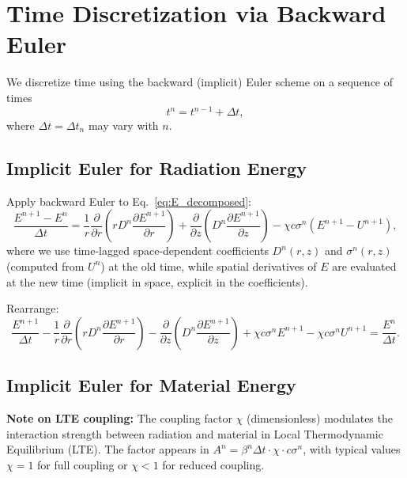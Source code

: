 \documentclass[12pt,oneside]{article}
\begin{document}
\section{Time Discretization via Backward Euler}

We discretize time using the backward (implicit) Euler scheme on a sequence of times
\[
t^n = t^{n-1} + \Delta t,
\]
where $\Delta t = \Delta t_n$ may vary with $n$.

\subsection{Implicit Euler for Radiation Energy}

Apply backward Euler to Eq.~\eqref{eq:E_decomposed}:
\begin{equation}
\frac{E^{n+1} - E^n}{\Delta t}
=
\frac{1}{r}\frac{\partial}{\partial r}\left(rD^n\frac{\partial E^{n+1}}{\partial r}\right) + \frac{\partial}{\partial z}\left(D^n\frac{\partial E^{n+1}}{\partial z}\right)
-
\chi c\sigma^n(E^{n+1} - U^{n+1}),
\end{equation}
where we use time-lagged space-dependent coefficients $D^n(r,z)$ and $\sigma^n(r,z)$ (computed from $U^n$) at the old time, while spatial derivatives of $E$ are evaluated at the new time (implicit in space, explicit in the coefficients).

Rearrange:
\begin{equation}
\frac{E^{n+1}}{\Delta t}
-
\frac{1}{r}\frac{\partial}{\partial r}\left(rD^n\frac{\partial E^{n+1}}{\partial r}\right) 
-
\frac{\partial}{\partial z}\left(D^n\frac{\partial E^{n+1}}{\partial z}\right)
+
\chi c\sigma^n E^{n+1}
-
\chi c\sigma^n U^{n+1}
=
\frac{E^n}{\Delta t}.
\end{equation}

\subsection{Implicit Euler for Material Energy}

\textbf{Note on LTE coupling:} The coupling factor $\chi$ (dimensionless) modulates the interaction strength between radiation and material in Local Thermodynamic Equilibrium (LTE). The factor appears in $A^n = \beta^n \Delta t \cdot \chi \cdot c\sigma^n$, with typical values $\chi = 1$ for full coupling or $\chi < 1$ for reduced coupling.
\end{document}
